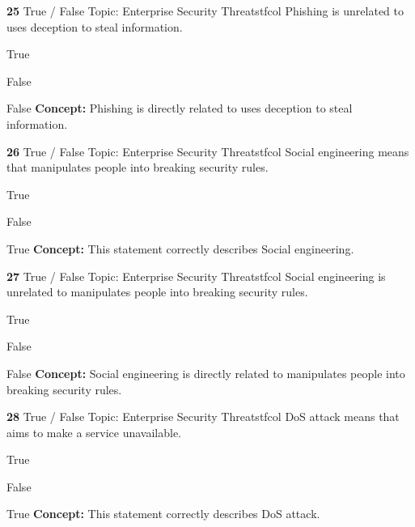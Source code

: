 \documentclass[10pt,a4paper]{article}
\begin{document}
\begin{qcard}{\color{white}\textbf{25} \hfill \small True / False \textbar{} Topic: Enterprise Security Threats}{tfcol}
Phishing is unrelated to uses deception to steal information.

\begin{qoptions}
\item True
\item False
\end{qoptions}
\begin{explainbox}{False}
\textbf{Concept:} Phishing is directly related to uses deception to steal information.
\end{explainbox}
\end{qcard}

\begin{qcard}{\color{white}\textbf{26} \hfill \small True / False \textbar{} Topic: Enterprise Security Threats}{tfcol}
Social engineering means that manipulates people into breaking security rules.

\begin{qoptions}
\item True
\item False
\end{qoptions}
\begin{explainbox}{True}
\textbf{Concept:} This statement correctly describes Social engineering.
\end{explainbox}
\end{qcard}

\begin{qcard}{\color{white}\textbf{27} \hfill \small True / False \textbar{} Topic: Enterprise Security Threats}{tfcol}
Social engineering is unrelated to manipulates people into breaking security rules.

\begin{qoptions}
\item True
\item False
\end{qoptions}
\begin{explainbox}{False}
\textbf{Concept:} Social engineering is directly related to manipulates people into breaking security rules.
\end{explainbox}
\end{qcard}

\begin{qcard}{\color{white}\textbf{28} \hfill \small True / False \textbar{} Topic: Enterprise Security Threats}{tfcol}
DoS attack means that aims to make a service unavailable.

\begin{qoptions}
\item True
\item False
\end{qoptions}
\begin{explainbox}{True}
\textbf{Concept:} This statement correctly describes DoS attack.
\end{explainbox}
\end{qcard}
\end{document}
